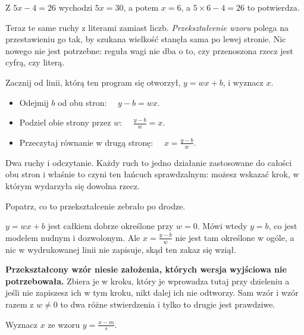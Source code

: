 \begin{fr}
Z $5x - 4 = 26$ wychodzi $5x = 30$, a potem $x = 6$, a
$5 \times 6 - 4 = 26$ to potwierdza.

Teraz te same ruchy z literami zamiast liczb. \emph{Przekształcenie wzoru}
polega na przestawieniu go tak, by szukana wielkość stanęła sama po lewej
stronie. Nic nowego nie jest potrzebne: reguła wagi nie dba o to, czy
przenoszona rzecz jest cyfrą, czy literą.

Zacznij od linii, którą ten program się otworzył, $y = wx + b$, i wyznacz $x$.

\begin{itemize}
\item Odejmij $b$ od obu stron: $\quad y - b = wx$.
\item Podziel obie strony przez $w$: $\quad \frac{y - b}{w} = x$.
\item Przeczytaj równanie w drugą stronę:
  $\quad x = \frac{y - b}{w}$.
\end{itemize}

Dwa ruchy i odczytanie. Każdy ruch to jedno działanie zastosowane do całości
obu stron i właśnie to czyni ten łańcuch sprawdzalnym: możesz wskazać krok, w
którym wydarzyła się dowolna rzecz.
\end{fr}


\begin{fr}
Popatrz, co to przekształcenie zebrało po drodze.

$y = wx + b$ jest całkiem dobrze określone przy $w = 0$. Mówi wtedy $y = b$, co
jest modelem nudnym i dozwolonym. Ale $x = \frac{y - b}{w}$ nie jest tam
określone w ogóle, a nic w wydrukowanej linii nie zapisuje, skąd ten zakaz się
wziął.

\textbf{Przekształcony wzór niesie założenia, których wersja wyjściowa nie
potrzebowała.} Zbiera je w kroku, który je wprowadza \dash{} tutaj przy
dzieleniu \dash{} a jeśli nie zapiszesz ich w tym kroku, nikt dalej ich nie
odtworzy. Sam wzór i wzór razem z $w \ne 0$ to dwa różne stwierdzenia i tylko
to drugie jest prawdziwe.

Wyznacz $x$ ze wzoru $y = \frac{x - m}{s}$.
\nextframe
\end{fr}

